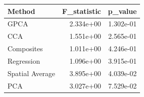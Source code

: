 \begin{tabular}{lrr}
\toprule
Method & F_statistic & p_value \\
\midrule
GPCA & 2.334e+00 & 1.302e-01 \\
CCA & 1.551e+00 & 2.565e-01 \\
Composites & 1.011e+00 & 4.246e-01 \\
Regression & 1.096e+00 & 3.915e-01 \\
Spatial Average & 3.895e+00 & 4.039e-02 \\
PCA & 3.027e+00 & 7.529e-02 \\
\bottomrule
\end{tabular}
